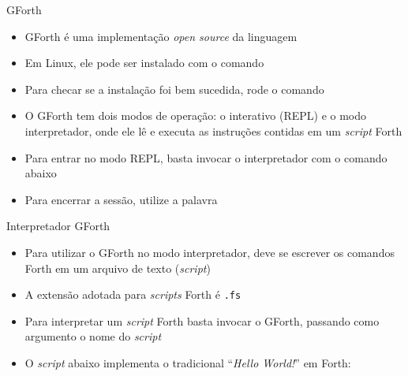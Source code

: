 \begin{frame}[fragile]{GForth}

    \begin{itemize}
        \item GForth é uma implementação \textit{open source} da linguagem

        \item Em Linux, ele pode ser instalado com o comando


        \item Para checar se a instalação foi bem sucedida, rode o comando


        \item O GForth tem dois modos de operação: o interativo (REPL) e o modo interpretador,
            onde ele lê e executa as instruções contidas em um \textit{script} Forth

        \item Para entrar no modo REPL, basta invocar o interpretador com o comando abaixo


        \item Para encerrar a sessão, utilize a palavra 
    \end{itemize}

\end{frame}

\begin{frame}[fragile]{Interpretador GForth}

    \begin{itemize}

        \item Para utilizar o GForth no modo interpretador, deve se escrever os comandos Forth
            em um arquivo de texto (\textit{script})

        \item A extensão adotada para \textit{scripts} Forth é \texttt{.fs}

        \item Para interpretar um \textit{script} Forth basta invocar o GForth, passando como 
            argumento o nome do \textit{script}


        \item O \textit{script} abaixo implementa o tradicional ``\textit{Hello World!}'' em Forth:

    \end{itemize}

\end{frame}
